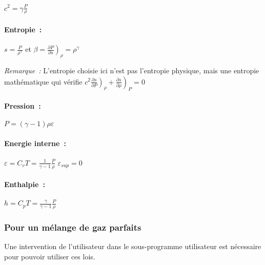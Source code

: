 $c^2 = \gamma \displaystyle\frac{P}{\rho}$


\paragraph{Entropie~:}

$s = \displaystyle\frac{P}{\rho^{\gamma}}$
\quad et
$\beta = \left.\displaystyle\frac{\partial P}{\partial s}\right)_{\rho}
= \rho^{\gamma}$

\noindent\textit{Remarque~:} L'entropie choisie ici n'est pas l'entropie
physique, mais une entropie mathématique qui vérifie \quad
$c^2 \left.\displaystyle\frac{\partial s}{\partial P}\right)_{\rho}
+ \left.\displaystyle\frac{\partial s}{\partial \rho}\right)_{P} = 0$


\paragraph{Pression~:}

$P = (\gamma-1) \rho \varepsilon$


\paragraph{Energie interne~:}

$\varepsilon = C_v T
= \displaystyle\frac{1}{\gamma-1} \displaystyle\frac{P}{\rho}$\qquad{}
$\varepsilon_{sup} = 0$

\paragraph{Enthalpie~:}

$h = C_p T
= \displaystyle\frac{\gamma}{\gamma-1} \displaystyle\frac{P}{\rho}$


\subsubsection*{Pour un mélange de gaz parfaits}

Une intervention de l'utilisateur dans le sous-programme utilisateur
 est nécessaire pour pouvoir utiliser ces lois.

